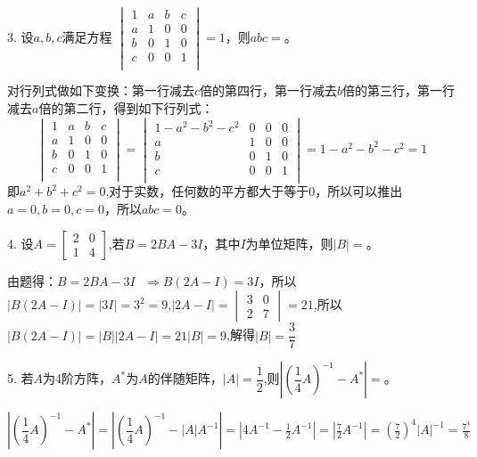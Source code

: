 \documentclass{article}
\begin{document}
3.
设$a,b,c$满足方程
$
\begin{vmatrix}
  1 & a & b & c\\
  a & 1 & 0 & 0\\
  b & 0 & 1 & 0\\
  c & 0 & 0 & 1\\
\end{vmatrix}=1
$，则$abc=$\underline{\hphantom{~~~~~~~~~~}}。

\begin{jie}
对行列式做如下变换：第一行减去$c$倍的第四行，第一行减去$b$倍的第三行，第一行减去$a$倍的第二行，得到如下行列式：
\begin{equation*}
\begin{vmatrix}
  1 & a & b & c\\
  a & 1 & 0 & 0\\
  b & 0 & 1 & 0\\
  c & 0 & 0 & 1\\
\end{vmatrix}=\begin{vmatrix}
  1-a^{2}-b^{2}-c^{2} & 0 & 0 & 0\\
  a & 1 & 0 & 0\\
  b & 0 & 1 & 0\\
  c & 0 & 0 & 1\\
\end{vmatrix}=1-a^{2}-b^{2}-c^{2}=1
\end{equation*}
即$a^{2}+b^{2}+c^{2}=0$,对于实数，任何数的平方都大于等于0，所以可以推出$a=0,b=0,c=0$，所以$abc=0$。
\end{jie}

4.
设$A=
\begin{bmatrix}
  2 & 0 \\
  1 & 4
\end{bmatrix}
$,若$B=2BA-3I$，其中$I$为单位矩阵，则$|B|=$\underline{\hphantom{~~~~~~~~~~}}。

\begin{jie}
由题得：$B=2BA-3I~~~\Rightarrow B(2A-I)=3I$，所以$|B(2A-I)|=|3I|=3^{2}=9$,$|2A-I|=
\begin{vmatrix}
  3 & 0 \\
  2 & 7
\end{vmatrix}=21
$,所以$|B(2A-I)|=|B||2A-I|=21|B|=9$,解得$|B|=\dfrac{3}{7}$
\end{jie}

5.
若$A$为4阶方阵，$A^{*}$为$A$的伴随矩阵，$|A|=\dfrac{1}{2}$,则$\left|\left(\dfrac{1}{4}A\right)^{-1}-A^{*}\right|=$\underline{\hphantom{~~~~~~~~~~}}。

\begin{jie}
$\left|\left(\dfrac{1}{4}A\right)^{-1}-A^{*}\right|=\left|\left(\dfrac{1}{4}A\right)^{-1}-|A|A^{-1}\right|=\left|4A^{-1}-\frac{1}{2}A^{-1}\right|=\left|\frac{7}{2}A^{-1}\right|=\left(\frac{7}{2}\right)^{4}|A|^{-1}=\frac{7^4}{8}$
\end{jie}
\end{document}
